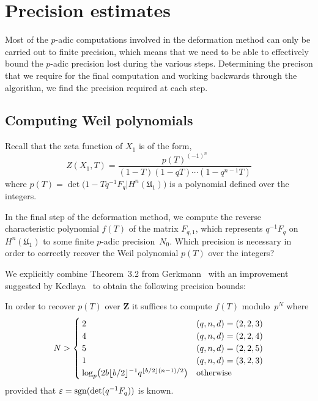 
\section{Precision estimates}

Most of the $p$-adic computations involved in the deformation 
method can only be carried out to finite precision, which means 
that we need to be able to effectively bound the $p$-adic 
precision lost during the various steps.  Determining the precison 
that we require for the final computation and working backwards 
through the algorithm, we find the precision required at 
each step.

\subsection{Computing Weil polynomials}

Recall that the zeta function of $X_1$ is of the form,
\begin{equation*}
Z(X_1,T) = \frac{p(T)^{(-1)^n}}{(1 - T) (1 - qT) \dotsm (1 - q^{n-1}T)}
\end{equation*}
where $p(T) = \det \bigl( 1 - T q^{-1} F_q | H^n(\mathfrak{U}_1) \bigr)$ 
is a polynomial defined over the integers.

In the final step of the deformation method, we compute the 
reverse characteristic polynomial $f(T)$ of the matrix $F_{q,1}$, 
which represents $q^{-1} F_q$ on $H^n(\mathfrak{U}_1)$ to some finite 
$p$-adic precision~$N_0$.  Which precision is necessary in order to 
correctly recover the Weil polynomial $p(T)$ over the integers?

We explicitly combine Theorem~{3.2} from Gerkmann~\citep{Gerkmann2007} 
with an improvement suggested by Kedlaya~\citep[Lemma~1.2.3]{Kedlaya2011}
to obtain the following precision bounds:

\begin{thm}
In order to recover $p(T)$ over $\mathbf{Z}$ it suffices to compute 
$f(T)$ modulo~$p^N$ where 
\begin{equation*}
N > \begin{cases}
    2 & (q,n,d) = (2,2,3) \\
    4 & (q,n,d) = (2,2,4) \\
    5 & (q,n,d) = (2,2,5) \\
    1 & (q,n,d) = (3,2,3) \\
    \log_p \bigl( 2 b \lfloor b/2\rfloor^{-1} q^{\left\lfloor b/2\right\rfloor (n - 1) / 2} \bigr) & \text{otherwise}
    \end{cases}
\end{equation*}
provided that $\varepsilon = \operatorname{sgn}(\det(q^{-1} F_q))$ is known.
\end{thm}

